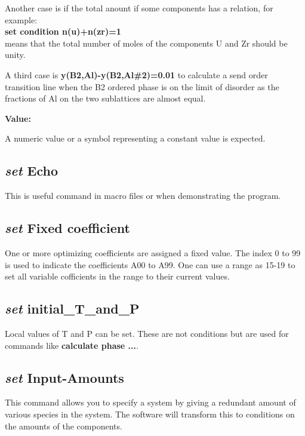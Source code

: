 \documentclass[11pt]{article}
\begin{document}
Another case is if the total anount if some components has a relation,
for example:\\ 
{\bf set condition n(u)+n(zr)=1}\\ 
means that the total number of moles of the components U and Zr should
be unity.

A third case is {\bf y(B2,Al)-y(B2,Al\#2)=0.01} to calculate a send
order transition line when the B2 ordered phase is on the limit of
disorder as the fractions of Al on the two sublattices are almost
equal.

{\bf Value:}

A numeric value or a symbol representing a constant value is expected.

\hypertarget{Set echo}{}
\subsection{{\em set} Echo}

This is useful command in macro files or when demonstrating the program.

\hypertarget{Set fix coeff}{}
\subsection{{\em set} Fixed coefficient}

One or more optimizing coefficients are assigned a fixed value.  The
index 0 to 99 is used to indicate the coefficients A00 to A99.  One
can use a range as 15-19 to set all variable cofficients in the range
to their current values.

\hypertarget{Set initial TP}{}
\subsection{{\em set} initial\_T\_and\_P}

Local values of T and P can be set.  These are not conditions but are
used for commands like {\bf calculate phase ...}.

\hypertarget{Set input amounts}{}
\subsection{{\em set} Input-Amounts}\label{sc:setinpuam}

This command allows you to specify a system by giving a redundant
amount of various species in the system.  The software will transform
this to conditions on the amounts of the components.
\end{document}
